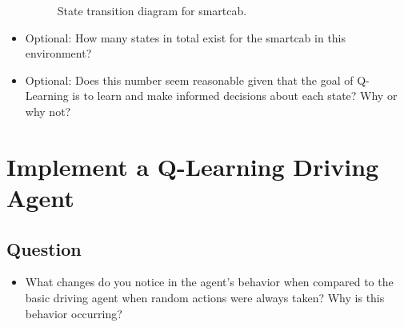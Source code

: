\documentclass[twoside,openright,titlepage,numbers=noenddot,headinclude,%
               footinclude=true,cleardoublepage=empty,abstractoff,BCOR=5mm,%
               paper=a4,fontsize=11pt,ngerman,american]{scrreprt}
\numberwithin{theorem}{chapter}
\numberwithin{definition}{chapter}
\numberwithin{algorithm}{chapter}
\numberwithin{figure}{chapter}
\numberwithin{table}{chapter}
\numberwithin{equation}{chapter}
\begin{document}
\begin{itemize}
\begin{figure}
\caption{State transition diagram for smartcab.}\label{fig:greenLight}
\end{figure}








\item Optional: How many states in total exist for the smartcab in this environment?
\item Optional: Does this number seem reasonable given that the goal of Q-Learning is to learn and make informed decisions about each state? Why or why not?
\end{itemize}





%
%

\chapter*{Implement a Q-Learning Driving Agent}

\section*{Question}

\begin{itemize}
\item What changes do you notice in the agent's behavior when compared to the basic driving agent when random actions were always taken? Why is this behavior occurring?

\end{itemize}
\end{document}
